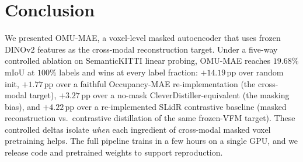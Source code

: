 \section{Conclusion}

We presented OMU-MAE, a voxel-level masked autoencoder that uses frozen
DINOv2 features as the cross-modal reconstruction target. Under a five-way
controlled ablation on SemanticKITTI linear probing, OMU-MAE reaches
$19.68\%$ mIoU at $100\%$ labels and wins at every label fraction:
$+14.19$\,pp over random init, $+1.77$\,pp over a faithful Occupancy-MAE
re-implementation (the cross-modal target), $+3.27$\,pp over a no-mask
CleverDistiller-equivalent (the masking bias), and $+4.22$\,pp over a
re-implemented SLidR contrastive baseline (masked reconstruction vs.\
contrastive distillation of the same frozen-VFM target). These controlled deltas isolate \emph{when} each ingredient of
cross-modal masked voxel pretraining helps. The full pipeline trains in a few hours on a single GPU, and we
release code and pretrained weights to support reproduction.
